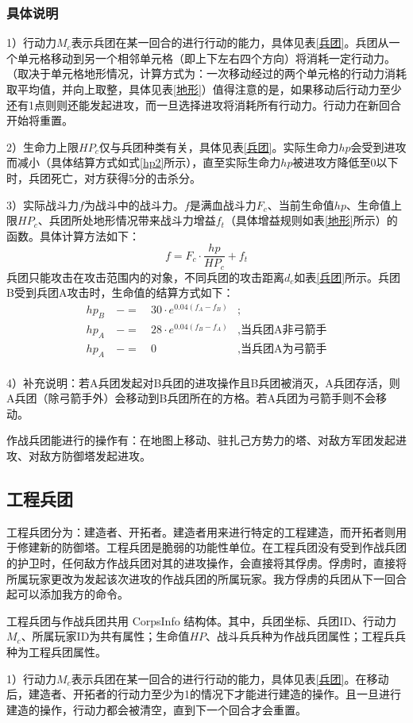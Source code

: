\documentclass[a4paper,4pt]{article}
\begin{document}
\subsubsection{具体说明}
1）行动力$M_c$表示兵团在某一回合的进行行动的能力，具体见表\ref{兵团}。兵团从一个单元格移动到另一个相邻单元格（即上下左右四个方向）将消耗一定行动力。（取决于单元格地形情况，计算方式为：一次移动经过的两个单元格的行动力消耗取平均值，并向上取整，具体见表\ref{地形}）值得注意的是，如果移动后行动力至少还有1点则则还能发起进攻，而一旦选择进攻将消耗所有行动力。行动力在新回合开始将重置。\par
2）生命力上限$HP_c$仅与兵团种类有关，具体见表\ref{兵团}。实际生命力$hp$会受到进攻而减小（具体结算方式如式\ref{hp2}所示），直至实际生命力$hp$被进攻方降低至0以下时，兵团死亡，对方获得5分的击杀分。\par
3）实际战斗力$f$为战斗中的战斗力。$f$是满血战斗力$F_c$、当前生命值$hp$、生命值上限$HP_c$、兵团所处地形情况带来战斗力增益$f_t$（具体增益规则如表\ref{地形}所示）的函数。具体计算方法如下：
\begin{equation}
	f = F_c \cdot \frac{hp}{HP_c} + f_t\label{f2}
\end{equation}
兵团只能攻击在攻击范围内的对象，不同兵团的攻击距离$d_c$如表\ref{兵团}所示。兵团B受到兵团A攻击时，生命值的结算方式如下：
\begin{equation}
	\begin{aligned}
		hp_{B} & \ -= & \ 30 \cdot e^{0.04(f_{A}-f_{B})} & ;                        \\
		hp_{A} & \ -= & \ 28 \cdot e^{0.04(f_{B}-f_{A})} & , \text{当兵团A非弓箭手} \\
		hp_{A} & \ -= & \ 0                              & , \text{当兵团A为弓箭手} \\
	\end{aligned}
	\label{hp2}
\end{equation}\par
4）补充说明：若A兵团发起对B兵团的进攻操作且B兵团被消灭，A兵团存活，则A兵团（除弓箭手外）会移动到B兵团所在的方格。若A兵团为弓箭手则不会移动。

作战兵团能进行的操作有：在地图上移动、驻扎己方势力的塔、对敌方军团发起进攻、对敌方防御塔发起进攻。


\subsection{工程兵团}
工程兵团分为：建造者、开拓者。建造者用来进行特定的工程建造，而开拓者则用于修建新的防御塔。工程兵团是脆弱的功能性单位。在工程兵团没有受到作战兵团的护卫时，任何敌方作战兵团对其的进攻操作，会直接将其俘虏。俘虏时，直接将所属玩家更改为发起该次进攻的作战兵团的所属玩家。我方俘虏的兵团从下一回合起可以添加我方的命令。\par%
工程兵团与作战兵团共用 CorpsInfo 结构体。其中，兵团坐标、兵团ID、行动力$M_c$、所属玩家ID为共有属性；生命值$HP$、战斗兵兵种为作战兵团属性；工程兵兵种为工程兵团属性。\par
1）行动力$M_c$表示兵团在某一回合的进行行动的能力，具体见表\ref{兵团}。在移动后，建造者、开拓者的行动力至少为1的情况下才能进行建造的操作。且一旦进行建造的操作，行动力都会被清空，直到下一个回合才会重置。\par
\end{document}

